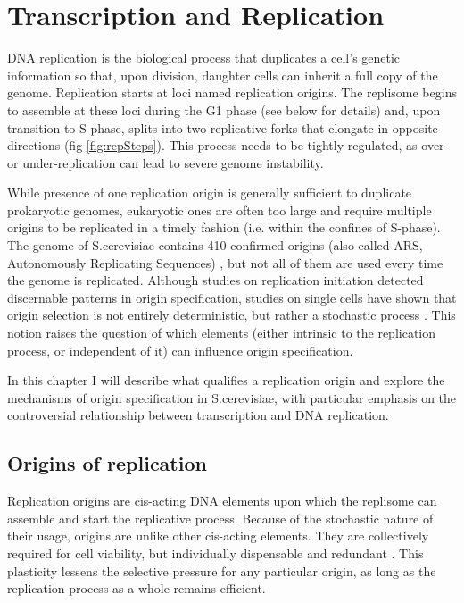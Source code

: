 \chapter{Transcription and Replication} %
DNA replication is the biological process that duplicates a cell’s genetic information so that, upon division, daughter cells can inherit a full copy of the genome. 
Replication starts at loci named replication origins. The replisome begins to assemble at these loci during the G1 phase (see below for details) and, upon transition to S-phase, splits into two replicative forks that elongate in opposite directions (fig \ref{fig:repSteps}). 
This process needs to be tightly regulated, as over- or under-replication can lead to severe genome instability. 


While presence of one replication origin is generally sufficient to duplicate prokaryotic genomes, eukaryotic ones are often too large and require multiple origins to be replicated in a timely fashion (i.e. within the confines of S-phase). 
The genome of S.cerevisiae contains 410 confirmed origins (also called ARS, Autonomously Replicating Sequences) \cite{siow:2012:oridb}, but not all of them are used every time the genome is replicated.
Although studies on replication initiation detected discernable patterns in origin specification, studies on single cells have shown that origin selection is not entirely deterministic, but rather a stochastic process \cite{patel:2006:dna, Czajkowsky:2008:dna}. 
This notion raises the question of which elements (either intrinsic to the replication process, or independent of it) can influence origin specification.

In this chapter I will describe what qualifies a replication origin and explore the mechanisms of origin specification in S.cerevisiae, with particular emphasis on the controversial relationship between transcription and DNA replication.

\section{Origins of replication}

Replication origins are cis-acting DNA elements upon which the replisome can assemble and start the replicative process. Because of the stochastic nature of their usage, origins are unlike other cis-acting elements. 
They are collectively required for cell viability, but individually dispensable and redundant \cite{bogenschutz:2014:initiation, dershowitz:2007:linear}. 
This plasticity lessens the selective pressure for any particular origin, as long as the replication process as a whole remains efficient. 


